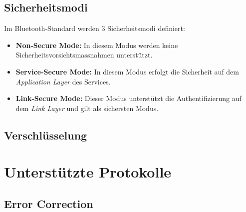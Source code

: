 \subsection{Sicherheitsmodi}
Im Bluetooth-Standard werden 3 Sicherheitsmodi definiert:
\begin{itemize}
	\item \textbf{Non-Secure Mode:} In diesem Modus werden keine Sicherheitsvorsichtsmassnahmen unterstützt.
	\item \textbf{Service-Secure Mode:} In diesem Modus erfolgt die Sicherheit auf dem \textit{Application Layer} des Services.
	\item \textbf{Link-Secure Mode:} Dieser Modus unterstützt die Authentifizierung auf dem \textit{Link Layer} und gilt als sichersten Modus.
\end{itemize}

\subsection{Verschlüsselung}



\section{Unterstützte Protokolle}

\subsection{Error Correction}


